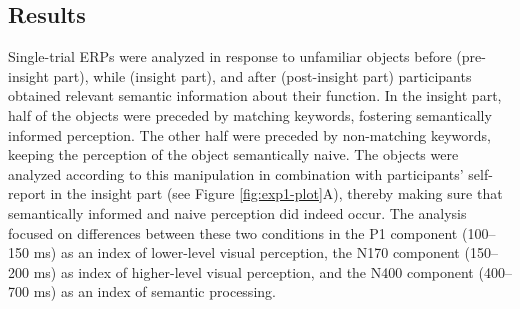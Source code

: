 \documentclass[
  english,
  man,floatsintext]{apa7}
\begin{document}
\hypertarget{results}{%
\subsection{Results}\label{results}}

Single-trial ERPs were analyzed in response to unfamiliar objects before (pre-insight part), while (insight part), and after (post-insight part) participants obtained relevant semantic information about their function. In the insight part, half of the objects were preceded by matching keywords, fostering semantically informed perception. The other half were preceded by non-matching keywords, keeping the perception of the object semantically naive. The objects were analyzed according to this manipulation in combination with participants' self-report in the insight part (see Figure \ref{fig:exp1-plot}A), thereby making sure that semantically informed and naive perception did indeed occur. The analysis focused on differences between these two conditions in the P1 component (100--150 ms) as an index of lower-level visual perception, the N170 component (150--200 ms) as index of higher-level visual perception, and the N400 component (400--700 ms) as an index of semantic processing.
\end{document}
